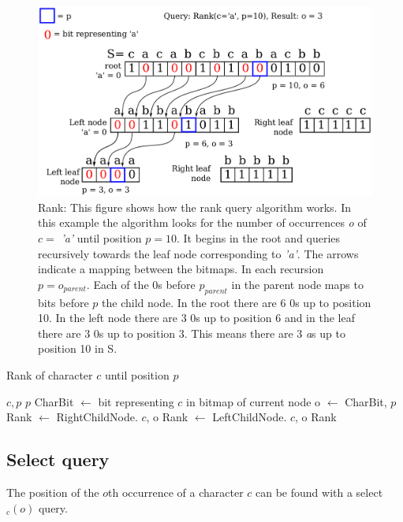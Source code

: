 \begin{figure}
\center \includegraphics[width=1\textwidth]{RankDrawing}
\caption{Rank: This figure shows how the rank query algorithm works. 
In this example the algorithm looks for the number of occurrences \textit{o} of $c = $ \textit{'a'} until position $p = 10$.
It begins in the root and queries recursively towards the leaf node corresponding to \textit{'a'}.
The arrows indicate a mapping between the bitmaps.
In each recursion $p = o_{parent}$.
Each of the 0s before $p_{parent}$ in the parent node maps to bits before $p$ the child node.
In the root there are 6 0s up to position 10. 
In the left node there are 3 0s up to position 6
and in the leaf there are 3 0s up to position 3. This means there are 3 \textit{a}s up to position 10 in S.}
\label{fig:RankDrawing}
\end{figure}

\begin{algorithm}
\caption{Rank of character $c$ until position $p$}
\label{alg:rank}
\begin{algorithmic} 
 {$c, p$}
\State \Return $p$
\EndIf
\State CharBit $\gets$ bit representing $c$ in bitmap of current node
\State o $\gets$  {CharBit, $p$}
	\State Rank $\gets$ RightChildNode. {$c$, o}
\Else
	\State Rank $\gets$ LeftChildNode. {$c$, o}
\EndIf
\State \Return Rank
\EndFunction
\end{algorithmic}
\end{algorithm}


\subsection{Select query}
\label{sec:selectDescription}
The position of the $o$th occurrence of a character $c$ can be found with a select$_c(o)$ query.


